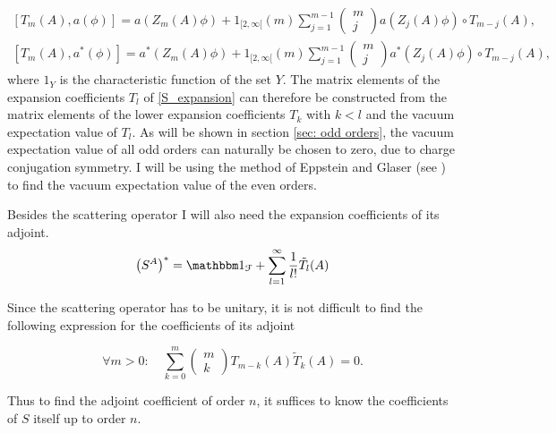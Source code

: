 \documentclass[b5paper,draft,openbib,12pt]{memoir}
\newcommand{\id}{{\mathbbm 1}}
\begin{document}
\begin{align}
\left[T_m(A) , a(\phi)\right]= a\left(Z_m (A) \phi \right) + 1_{[2,\infty[}(m)\sum_{j=1}^{m-1} \begin{pmatrix} m \\ j \end{pmatrix} a\left(Z_j (A) \phi \right)\circ T_{m-j}(A), \label{Tk_commutation_relation_annihilator}\\
\left[T_m(A) , a^*(\phi)\right]= a^*\left(Z_m (A) \phi \right) + 1_{[2,\infty[}(m)\sum_{j=1}^{m-1} \begin{pmatrix} m \\ j \end{pmatrix} a^*\left(Z_j (A) \phi \right)\circ T_{m-j}(A),\label{Tk_commutation_relation_creator}
\end{align}
where \(1_{Y}\) is the characteristic function of the set \(Y\).
The matrix elements of the expansion coefficients \(T_l\) of \eqref{S_expansion} can therefore be constructed from the matrix elements of the lower expansion coefficients \(T_k\) with \(k<l\) and the vacuum expectation value of \(T_l\). As will be shown in section \ref{sec: odd orders}, the vacuum expectation value of all odd orders can naturally be chosen to zero, due to charge conjugation symmetry. I will be using the method of Eppstein and Glaser (see \cite{epstein1973role, scharf2014finite})  to find the vacuum expectation value of the even orders.

Besides the scattering operator I will also need the expansion coefficients of its adjoint. 
\begin{equation}\label{S_adjoint}
\left(S^A\right)^*=\id_\mathcal{F}+\sum_{l=1}^\infty \frac{1}{l!} \tilde{T}_l(A)
\end{equation}

Since the scattering operator has to be unitary, it is not difficult to find the following expression for the coefficients of its adjoint

\begin{equation}
\forall m>0:\quad \sum_{k=0}^m \begin{pmatrix}
m\\k
\end{pmatrix} T_{m-k} (A) \tilde{T}_{k}(A)=0.
\end{equation}

Thus to find the adjoint coefficient of order \(n\), it suffices to know the coefficients of \(S\) itself up to order \(n\). 
\end{document}
